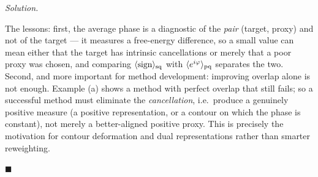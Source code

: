\documentclass[11pt]{article}
\newenvironment{solution}{\par\smallskip\noindent\textit{Solution.}\ }{\hfill$\blacksquare$\par\smallskip}
\begin{document}
\begin{solution}
\begin{itemize}
\end{itemize}
The lessons: first, the average phase is a diagnostic of the \emph{pair} (target, proxy) and not of the target --- it measures a free-energy difference, so a small value can mean either that the target has intrinsic cancellations or merely that a poor proxy was chosen, and comparing $\langle\mathrm{sign}\rangle_{\rm sq}$ with $\langle e^{i\varphi}\rangle_{\rm pq}$ separates the two. Second, and more important for method development: improving overlap alone is not enough. Example (a) shows a method with perfect overlap that still fails; so a successful method must eliminate the \emph{cancellation}, i.e.\ produce a genuinely positive measure (a positive representation, or a contour on which the phase is constant), not merely a better-aligned positive proxy. This is precisely the motivation for contour deformation and dual representations rather than smarter reweighting.


\end{solution}
\end{document}
